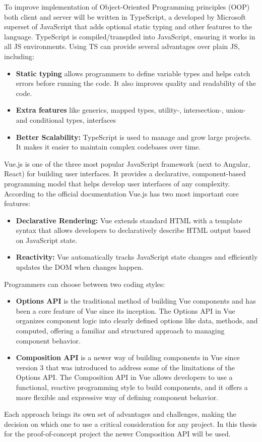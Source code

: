 To improve implementation of Object-Oriented Programming principles (OOP) both client and server will be written in TypeScript, a developed by Microsoft superset of JavaScript that adds optional static typing and other features to the language. TypeScript is compiled/transpiled into JavaScript, ensuring it works in all JS environments. Using TS can provide several advantages over plain JS, including:
\begin{itemize}
    \item \textbf{Static typing} allows programmers to define variable types and helps catch errors before running the code. It also improves quality and readability of the code.
    \item \textbf{Extra features} like generics, mapped types, utility-, intersection-, union- and conditional types, interfaces
    \item \textbf{Better Scalability:} TypeScript is used to manage and grow large projects. It makes it easier to maintain complex codebases over time.
\end{itemize}
\autocite{TSDoc} \autocite{TSfeatures}
\newline

Vue.js is one of the three most popular JavaScript framework (next to Angular, React) for building user  interfaces. It provides a declarative, component-based programming model that helps develop user interfaces of any complexity. According to the official documentation Vue.js has two most important core features:
\begin{itemize}
    \item \textbf{Declarative Rendering:} Vue extends standard HTML with a template syntax that allows developers to declaratively describe HTML output based on JavaScript state.
    \item \textbf{Reactivity:} Vue automatically tracks JavaScript state changes and efficiently updates the DOM when changes happen.
\end{itemize}


Programmers can choose between two coding styles:
\begin{itemize}
    \item \textbf{Options API} is the traditional method of building Vue components and has been a core feature of Vue since its inception. The Options API in Vue organizes component logic into clearly defined options like data, methods, and computed, offering a familiar and structured approach to managing component behavior.
    \item \textbf{Composition API} is a newer way of building components in Vue since version 3 that was introduced to address some of the limitations of the Options API. The Composition API in Vue allows developers to use a functional, reactive programming style to build components, and it offers a more flexible and expressive way of defining component behavior.
\end{itemize}
Each approach brings its own set of advantages and challenges, making the decision on which one to use a critical consideration for any project. In this thesis for the proof-of-concept project the newer Composition API will be used.

